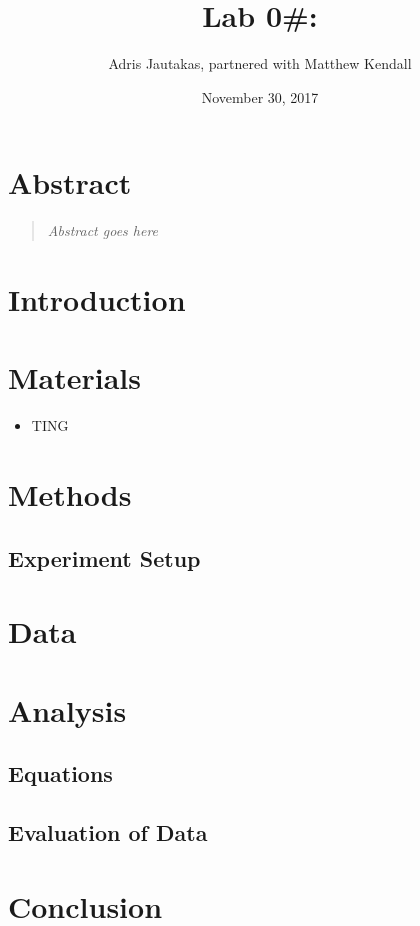 \documentclass[12pt]{article}
\title{Lab 0#: }
\author{Adris Jautakas, partnered with Matthew Kendall}
\date{November 30, 2017}
\begin{document}
    \maketitle
    \pagebreak
    \section*{Abstract}
        \begin{quote}
        {\textit {\small 
            Abstract goes here
        } }
        \end{quote}

    \section{Introduction}

    \section{Materials}
        \begin{itemize}
            \item TING
        \end{itemize}
    
    \section{Methods}
        \subsection{Experiment Setup}
    
    \section{Data}
    
    \section{Analysis}
        \subsection{Equations}
        \subsection{Evaluation of Data}
    
    \section{Conclusion}
        
\end{document}
